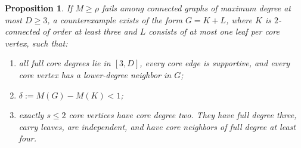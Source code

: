 \documentclass[11pt,a4paper]{article}
\newtheorem{proposition}[theorem]{Proposition}
\theoremstyle{definition}\newtheorem{definition}[theorem]{Definition}
\theoremstyle{remark}\newtheorem{remark}[theorem]{Remark}
\begin{document}
\begin{proposition}\label{prop:g7-reduction}
If $M\ge\rho$ fails among connected graphs of maximum degree at most
$D\ge3$, a counterexample exists of the form $G=K+L$, where $K$ is
$2$-connected of order at least three and $L$ consists of at most one
leaf per core vertex, such that:
\begin{enumerate}[label=(\roman*)]
\item all full core degrees lie in $[3,D]$, every core edge is supportive,
and every core vertex has a lower-degree neighbor in $G$;
\item $\delta:=M(G)-M(K)<1$;
\item exactly $s\le2$ core vertices have core degree two. They have full
degree three, carry leaves, are independent, and have core neighbors
of full degree at least four.
\end{enumerate}
\end{proposition}
\end{document}
